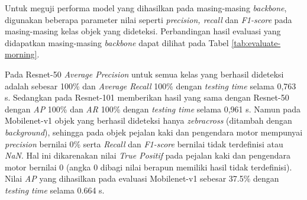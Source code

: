 Untuk meguji performa model yang dihasilkan pada masing-masing \textit{backbone}, digunakan beberapa parameter nilai seperti \textit{precision, recall} dan \textit{F1-score} pada masing-masing kelas objek yang dideteksi. Perbandingan hasil evaluasi yang didapatkan masing-masing \textit{backbone} dapat dilihat pada Tabel \ref{tab:evaluate-morning}.

Pada Resnet-50 \textit{Average Precision} untuk semua kelas yang berhasil dideteksi adalah sebesar 100\% dan \textit{Average Recall} 100\% dengan \textit{testing time} selama 0,763 s. Sedangkan pada Resnet-101 memberikan hasil yang sama dengan Resnet-50 dengan \textit{AP} 100\% dan \textit{AR} 100\% dengan \textit{testing time} selama 0,961 s. Namun pada Mobilenet-v1 objek yang berhasil dideteksi hanya \textit{zebracross} (ditambah dengan \textit{background}), sehingga pada objek pejalan kaki dan pengendara motor mempunyai \textit{precision} bernilai 0\% serta \textit{Recall} dan \textit{F1-score} bernilai tidak terdefinisi atau \textit{NaN}. Hal ini dikarenakan nilai \textit{True Positif} pada pejalan kaki dan pengendara motor bernilai 0 (angka 0 dibagi nilai berapun memiliki hasil tidak terdefinisi). Nilai \textit{AP} yang dihasilkan pada evaluasi Mobilenet-v1 sebesar 37.5\% dengan \textit{testing time} selama 0.664 s.

